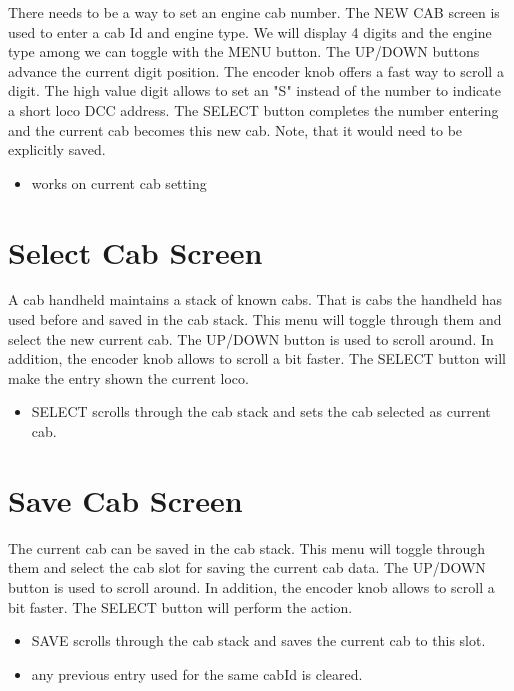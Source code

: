 There needs to be a way to set an engine cab number. The NEW CAB screen is used to enter a cab Id and engine type. We will display 4 digits and the engine type among we can toggle with the MENU button. The UP/DOWN buttons advance the current digit position. The encoder knob offers a fast way to scroll a digit. The high value digit allows to set an "S" instead of the number to indicate a short loco DCC address. The SELECT button completes the number entering and the current cab becomes this new cab. Note, that it would need to be explicitly saved.
\begin{itemize}
\begin{itemize}
\item works on current cab setting
\end{itemize}
\end{itemize}

\section{Select Cab Screen}

A cab handheld maintains a stack of known cabs. That is cabs the handheld has used before and saved in the cab stack. This menu will toggle through them and select the new current cab. The UP/DOWN button is used to scroll around. In addition, the encoder knob allows to scroll a bit faster. The SELECT button will make the entry shown the current loco.
\begin{itemize}
\begin{itemize}
\item SELECT scrolls through the cab stack and sets the cab selected as current cab.
\end{itemize}
\end{itemize}

\section{Save Cab Screen}

The current cab can be saved in the cab stack. This menu will toggle through them and select the cab slot for saving the current cab data. The UP/DOWN button is used to scroll around. In addition, the encoder knob allows to scroll a bit faster. The SELECT button will perform the action.
\begin{itemize}
\begin{itemize}
\item SAVE scrolls through the cab stack and saves the current cab to this slot.
\item any previous entry used for the same cabId is cleared.
\end{itemize}
\end{itemize}

